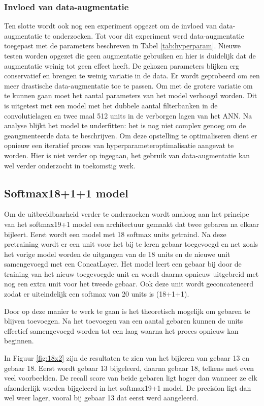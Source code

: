 \subsubsection{Invloed van data-augmentatie}
Ten slotte wordt ook nog een experiment opgezet om de invloed van data-augmentatie te onderzoeken. Tot voor dit experiment werd data-augmentatie toegepast met de parameters beschreven in Tabel \ref{tab:hyperparam}. Nieuwe testen worden opgezet die geen augmentatie gebruiken en hier is duidelijk dat de augmentatie weinig tot geen effect heeft. De gekozen parameters blijken erg conservatief en brengen te weinig variatie in de data. Er wordt geprobeerd om een meer drastische data-augmentatie toe te passen. Om met de grotere variatie om te kunnen gaan moet het aantal parameters van het model verhoogd worden. Dit is uitgetest met een model met het dubbele aantal filterbanken in de convolutielagen en twee maal 512 units in de verborgen lagen van het ANN. Na analyse blijkt het model te underfitten: het is nog niet complex genoeg om de geaugmenteerde data te beschrijven. Om deze opstelling te optimaliseren dient er opnieuw een iteratief proces van hyperparameteroptimalisatie aangevat te worden. Hier is niet verder op ingegaan, het gebruik van data-augmentatie kan wel verder onderzocht in toekomstig werk.

\subsection{Softmax18+1+1 model}

Om de uitbreidbaarheid verder te onderzoeken wordt analoog aan het principe van het softmax19+1 model een architectuur gemaakt dat twee gebaren na elkaar bijleert. Eerst wordt een model met 18 softmax units getraind. Na deze pretraining wordt er een unit voor het bij te leren gebaar toegevoegd en net zoals het vorige model worden de uitgangen van de 18 units en de nieuwe unit samengevoegd met een ConcatLayer.
\npar Het model leert een gebaar bij door de training van het nieuw toegevoegde unit en wordt daarna opnieuw uitgebreid met nog een extra unit voor het tweede gebaar. Ook deze unit wordt geconcateneerd zodat er uiteindelijk een softmax van 20 units is (18+1+1).

\npar Door op deze manier te werk te gaan is het theoretisch mogelijk om gebaren te blijven toevoegen. Na het toevoegen van een aantal gebaren kunnen de units effectief samengevoegd worden tot een laag waarna het proces opnieuw kan beginnen.

\npar In Figuur \ref{fig:18x2} zijn de resultaten te zien van het bijleren van gebaar 13 en gebaar 18. Eerst wordt gebaar 13 bijgeleerd, daarna gebaar 18, telkens met even veel voorbeelden. De recall score van beide gebaren ligt hoger dan wanneer ze elk afzonderlijk worden bijgeleerd in het softmax19+1 model. De precision ligt dan wel weer lager, vooral bij gebaar 13 dat eerst werd aangeleerd.

